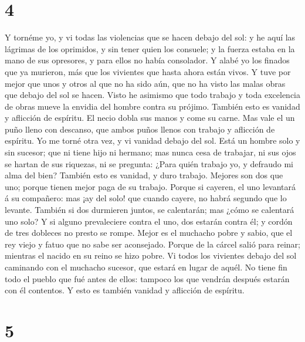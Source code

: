 \hypertarget{section-3}{%
\section{4}\label{section-3}}

 Y tornéme yo, y vi todas las violencias que se hacen
debajo del sol: y he aquí las lágrimas de los oprimidos, y sin tener
quien los consuele; y la fuerza estaba en la mano de sus opresores, y
para ellos no había consolador.  Y alabé yo los finados
que ya murieron, más que los vivientes que hasta ahora están vivos.
 Y tuve por mejor que unos y otros al que no ha sido aún,
que no ha visto las malas obras que debajo del sol se hacen.
 Visto he asimismo que todo trabajo y toda excelencia de
obras mueve la envidia del hombre contra su prójimo. También esto es
vanidad y aflicción de espíritu.  El necio dobla sus manos
y come su carne.  Mas vale el un puño lleno con descanso,
que ambos puños llenos con trabajo y aflicción de espíritu.
 Yo me torné otra vez, y vi vanidad debajo del sol.
 Está un hombre solo y sin sucesor; que ni tiene hijo ni
hermano; mas nunca cesa de trabajar, ni sus ojos se hartan de sus
riquezas, ni se pregunta: ¿Para quién trabajo yo, y defraudo mi alma del
bien? También esto es vanidad, y duro trabajo.  Mejores
son dos que uno; porque tienen mejor paga de su trabajo. 
Porque si cayeren, el uno levantará á su compañero: mas ¡ay del solo!
que cuando cayere, no habrá segundo que lo levante. 
También si dos durmieren juntos, se calentarán; mas ¿cómo se calentará
uno solo?  Y si alguno prevaleciere contra el uno, dos
estarán contra él; y cordón de tres dobleces no presto se rompe.
 Mejor es el muchacho pobre y sabio, que el rey viejo y
fatuo que no sabe ser aconsejado.  Porque de la cárcel
salió para reinar; mientras el nacido en su reino se hizo pobre.
 Vi todos los vivientes debajo del sol caminando con el
muchacho sucesor, que estará en lugar de aquél.  No tiene
fin todo el pueblo que fué antes de ellos: tampoco los que vendrán
después estarán con él contentos. Y esto es también vanidad y aflicción
de espíritu.

\hypertarget{section-4}{%
\section{5}\label{section-4}}

